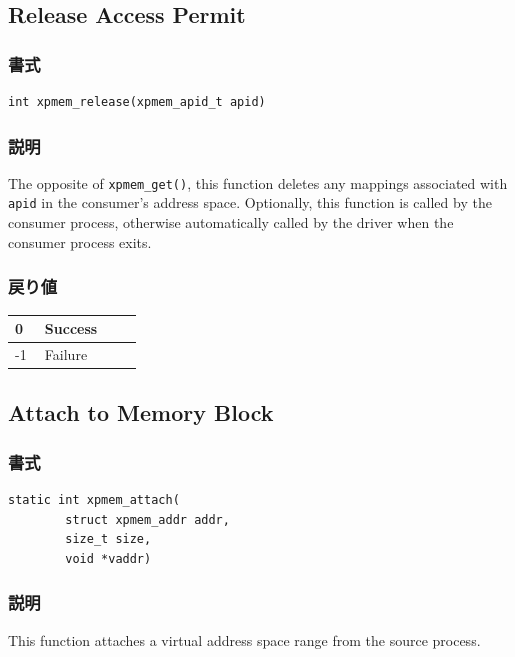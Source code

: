 \documentclass[twoside,11pt,fleqn]{book}
\begin{document}
\subsection{Release Access Permit}
\subsubsection*{書式}{\quad}
\begin{verbatim}
int xpmem_release(xpmem_apid_t apid)
\end{verbatim}

\subsubsection*{説明}{\quad}
The opposite of \texttt{xpmem\_get()}, this function deletes any mappings associated with \texttt{apid} in the
consumer's address space.
Optionally, this function is called by the consumer process, otherwise automatically
called by the driver when the consumer process exits.

\subsubsection*{戻り値}{\quad}
\begin{table}[!h]
\footnotesize
\begin{tabular}{|p{0.20\linewidth}|p{0.66\linewidth}|} \hline
0&Success\\ \hline
-1&Failure\\ \hline
\end{tabular}
\vspace{-0em}
\end{table}
\FloatBarrier

\subsection{Attach to Memory Block}
\subsubsection*{書式}{\quad}
\begin{verbatim}
static int xpmem_attach(
        struct xpmem_addr addr,
        size_t size,
        void *vaddr)
\end{verbatim}

\subsubsection*{説明}{\quad}
This function attaches a virtual address space range from the source process.
\end{document}
